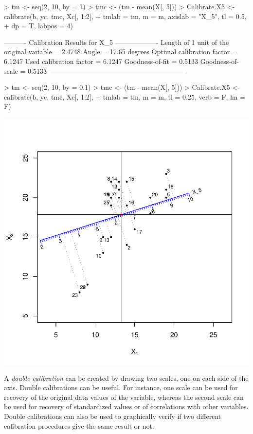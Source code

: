 \documentclass[a4paper]{article}
\begin{document}
\begin{Schunk}
\begin{Sinput}
> tm <- seq(2, 10, by = 1)
> tmc <- (tm - mean(X[, 5]))
> Calibrate.X5 <- calibrate(b, yc, tmc, Xc[, 1:2], 
+     tmlab = tm, m = m, axislab = "X_5", tl = 0.5, 
+     dp = T, labpos = 4)
\end{Sinput}
\begin{Soutput}
---------- Calibration Results for  X_5  -------------------
Length of 1 unit of the original variable =  2.4748  
Angle                                     =  17.65 degrees
Optimal calibration factor                =  6.1247  
Used calibration factor                   =  6.1247  
Goodness-of-fit                           =  0.5133  
Goodness-of-scale                         =  0.5133  
------------------------------------------------------------
\end{Soutput}
\begin{Sinput}
> tm <- seq(2, 10, by = 0.1)
> tmc <- (tm - mean(X[, 5]))
> Calibrate.X5 <- calibrate(b, yc, tmc, Xc[, 1:2], 
+     tmlab = tm, m = m, tl = 0.25, verb = F, lm = F)
\end{Sinput}
\end{Schunk}
\includegraphics{CalibrationGuide-008}

A {\it double calibration} can be created by drawing two scales, one on each side of the axis. Double
calibrations can be useful. For instance, one scale can be used for recovery of the original 
data values of the variable, whereas the second scale can be used for recovery of standardized values or
of correlations with other variables. Double calibrations can also be used to 
graphically verify if two different calibration procedures give the same result or not. 
\end{document}
